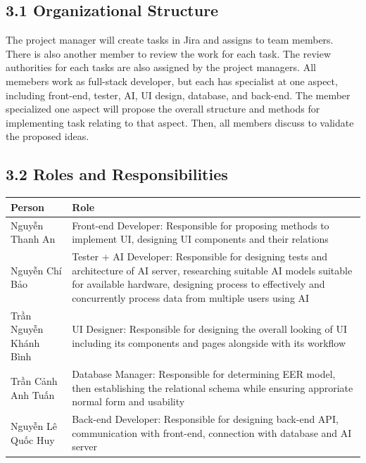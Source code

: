 \documentclass[12pt]{article}
\renewcommand{\baselinestretch}{1.5}
\begin{document}
\subsection*{3.1 Organizational Structure}
\par\medskip
The project manager will create tasks in Jira and assigns to team members. There is also another member to review the work for each task. The review authorities for each tasks are also assigned by the project managers. All memebers work as full-stack developer, but each has specialist at one aspect, including front-end, tester, AI, UI design, database, and back-end. The member specialized one aspect will propose the overall structure and methods for implementing task relating to that aspect. Then, all members discuss to validate the proposed ideas.
\par\medskip
\hypertarget{sec:32-roles-and-responsibilities}{}
\subsection*{3.2 Roles and Responsibilities}
\par\medskip
\begingroup
\scriptsize
\renewcommand{\baselinestretch}{1.0}\selectfont
\renewcommand{\arraystretch}{1.15}
\setlength{\tabcolsep}{4pt}
\begin{longtable}{|>{\raggedright\arraybackslash}p{}|>{\raggedright\arraybackslash}p{}|}
\hline
Person & Role \\ \hline
\endhead
Nguyễn Thanh An & Front-end Developer: Responsible for proposing methods to implement UI, designing UI components and their relations \\ \hline
Nguyễn Chí Bảo & Tester + AI Developer: Responsible for designing tests and architecture of AI server, researching suitable AI models suitable for available hardware, designing process to effectively and concurrently process data from multiple users using AI \\ \hline
Trần Nguyễn Khánh Bình & UI Designer: Responsible for designing the overall looking of UI including its components and pages alongside with its workflow \\ \hline
Trần Cảnh Anh Tuấn & Database Manager: Responsible for determining EER model, then establishing the relational schema while ensuring approriate normal form and usability \\ \hline
Nguyễn Lê Quốc Huy & Back-end Developer: Responsible for designing back-end API, communication with front-end, connection with database and AI server \\ \hline
\end{longtable}
\endgroup
\par\medskip
\hypertarget{sec:4-management-process}{}
\end{document}
